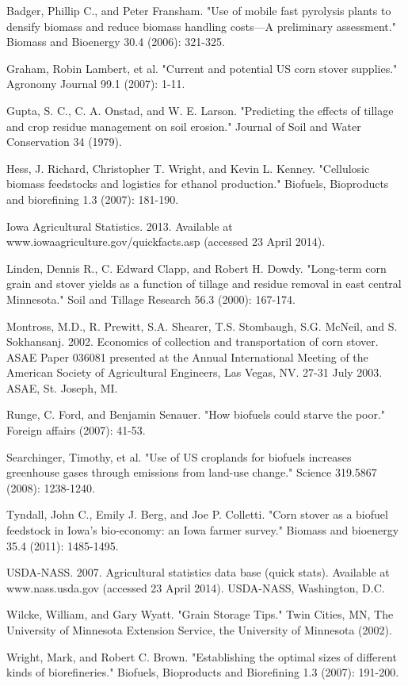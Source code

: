 \documentclass{article}\usepackage[]{graphicx}\usepackage[]{color}
\begin{document}
\begin{thebibliography}{25}

 Badger, Phillip C., and Peter Fransham. "Use of mobile fast pyrolysis plants to densify biomass and reduce biomass handling costs—A preliminary assessment." Biomass and Bioenergy 30.4 (2006): 321-325.

 Graham, Robin Lambert, et al. "Current and potential US corn stover supplies." Agronomy Journal 99.1 (2007): 1-11.

 Gupta, S. C., C. A. Onstad, and W. E. Larson. "Predicting the effects of tillage and crop residue management on soil erosion." Journal of Soil and Water Conservation 34 (1979).

 Hess, J. Richard, Christopher T. Wright, and Kevin L. Kenney. "Cellulosic biomass feedstocks and logistics for ethanol production." Biofuels, Bioproducts and biorefining 1.3 (2007): 181-190.

 Iowa Agricultural Statistics. 2013.  Available at www.iowaagriculture.gov/quickfacts.asp (accessed 23 April 2014).

 Linden, Dennis R., C. Edward Clapp, and Robert H. Dowdy. "Long-term corn grain and stover yields as a function of tillage and residue removal in east central Minnesota." Soil and Tillage Research 56.3 (2000): 167-174.

 Montross, M.D., R. Prewitt, S.A. Shearer, T.S. Stombaugh, S.G. McNeil, and S. Sokhansanj.  2002.  Economics of collection and transportation of corn stover.  ASAE Paper 036081 presented at the Annual International Meeting of the American Society of Agricultural Engineers, Las Vegas, NV. 27-31 July 2003.  ASAE, St. Joseph, MI.

 Runge, C. Ford, and Benjamin Senauer. "How biofuels could starve the poor." Foreign affairs (2007): 41-53.

 Searchinger, Timothy, et al. "Use of US croplands for biofuels increases greenhouse gases through emissions from land-use change." Science 319.5867 (2008): 1238-1240.

 Tyndall, John C., Emily J. Berg, and Joe P. Colletti. "Corn stover as a biofuel feedstock in Iowa’s bio-economy: an Iowa farmer survey." Biomass and bioenergy 35.4 (2011): 1485-1495.

 USDA-NASS. 2007.  Agricultural statistics data base (quick stats).  Available at www.nass.usda.gov (accessed 23 April 2014).  USDA-NASS, Washington, D.C.

 Wilcke, William, and Gary Wyatt. "Grain Storage Tips." Twin Cities, MN, The University of Minnesota Extension Service, the University of Minnesota (2002).

 Wright, Mark, and Robert C. Brown. "Establishing the optimal sizes of different kinds of biorefineries." Biofuels, Bioproducts and Biorefining 1.3 (2007): 191-200.

\end{thebibliography}
\end{document}
